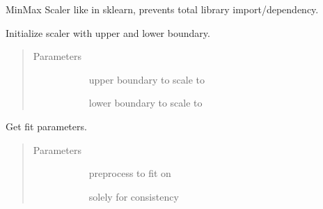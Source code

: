 \documentclass[letterpaper,10pt,english]{sphinxmanual}
\begin{document}
\begin{fulllineitems}
\label{\detokenize{autoapi/src/utils/preprocess/index:src.utils.preprocess.MinMaxScaler}}
MinMax Scaler like in sklearn, prevents total library import/dependency.

Initialize scaler with upper and lower boundary.
\begin{quote}\begin{description}
\item[{Parameters}] \leavevmode\begin{description}
\item[{}] \leavevmode{[}\sphinxhref{https://docs.python.org/3/library/functions.html\#float}{\sphinxcode{\sphinxupquote{float}}}{]}
upper boundary to scale to

\item[{}] \leavevmode{[}\sphinxhref{https://docs.python.org/3/library/functions.html\#float}{\sphinxcode{\sphinxupquote{float}}}{]}
lower boundary to scale to

\end{description}

\end{description}\end{quote}

\begin{fulllineitems}
\label{\detokenize{autoapi/src/utils/preprocess/index:src.utils.preprocess.MinMaxScaler.fit}}
Get fit parameters.
\begin{quote}\begin{description}
\item[{Parameters}] \leavevmode\begin{description}
\item[{}] \leavevmode{[}\sphinxcode{\sphinxupquote{np.array}}{]}
preprocess to fit on

\item[{}] \leavevmode{[}\sphinxhref{https://docs.python.org/3/library/constants.html\#None}{\sphinxcode{\sphinxupquote{None}}}{]}
solely for consistency


\end{description}
\end{description}
\end{quote}
\end{fulllineitems}
\end{fulllineitems}
\end{document}

